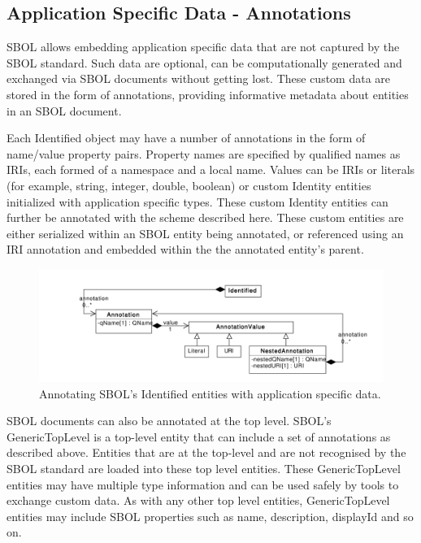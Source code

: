 \documentclass[draftspec]{sbmlpkgspec}
\begin{document}
\subsection{Application Specific Data - Annotations}
\label{sec:annotations}
SBOL allows embedding application specific data that are not captured by the SBOL standard. Such data are optional, can be computationally generated and exchanged via SBOL documents without getting lost. These custom data are stored in the form of annotations, providing informative metadata about entities in an SBOL document.

Each Identified object may have a number of annotations in the form of name/value property pairs. Property names are specified by qualified names as IRIs, each formed of a namespace and a local name. Values can be IRIs or literals (for example, string, integer, double, boolean) or custom Identity entities initialized with application specific types. These custom Identity entities can further be annotated with the scheme described here. These custom entities are either serialized within an SBOL entity being annotated, or referenced using an IRI annotation and embedded within the the annotated entity's parent. 

\begin{figure}[!ht]
\begin{center}
\includegraphics[scale=0.8]{uml/identified_annotations}
\caption[]{Annotating SBOL's Identified entities with application specific data.}
\label{uml:identified_annotations}
\end{center}
\end{figure}

SBOL documents can also be annotated at the top level. SBOL's GenericTopLevel is a top-level entity that can include a set of annotations as described above. Entities that are at the top-level and are not recognised by the SBOL standard are loaded into these top level entities. These GenericTopLevel entities may have multiple type information and can be used safely by tools to exchange custom data. As with any other top level entities, GenericTopLevel entities may include SBOL properties such as name, description, displayId and so on.
\end{document}
